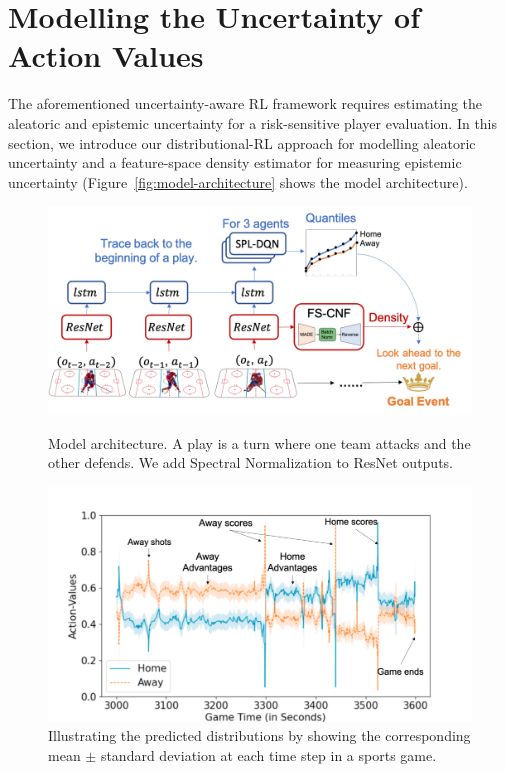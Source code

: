 \documentclass{article}
\begin{document}
\section{Modelling the Uncertainty of Action Values }\label{Sec:action-value-function}
The aforementioned uncertainty-aware RL framework requires estimating the aleatoric and epistemic uncertainty for a risk-sensitive player evaluation. In this section, we introduce our distributional-RL approach for modelling aleatoric uncertainty and a feature-space density estimator for measuring epistemic uncertainty (Figure~\ref{fig:model-architecture} shows the model architecture).
\begin{figure}[htbp]
\vspace{-0.15in}
\begin{minipage}[t]{0.51\textwidth}
    \hspace{-0.25in}\includegraphics[scale=0.35]{figures/ice-hockey-net.png}
    \captionsetup{width=.95\linewidth}
    \caption{Model architecture. A play is a turn where one team attacks and the other defends. We add Spectral Normalization to ResNet outputs.}
    \label{fig:model-architecture}
\end{minipage}%
\begin{minipage}[t]{0.49\textwidth}
    \centering
    \includegraphics[scale=0.24]{figures/temporal-visualization-marked.png}
    \captionsetup{width=.95\linewidth}
    \caption{Illustrating the predicted distributions by showing the corresponding mean $\pm$ standard deviation at each time step in a sports game.}
    \label{fig:temporal-plot}
\end{minipage}
\vspace{-0.2in}
\end{figure}
\end{document}
